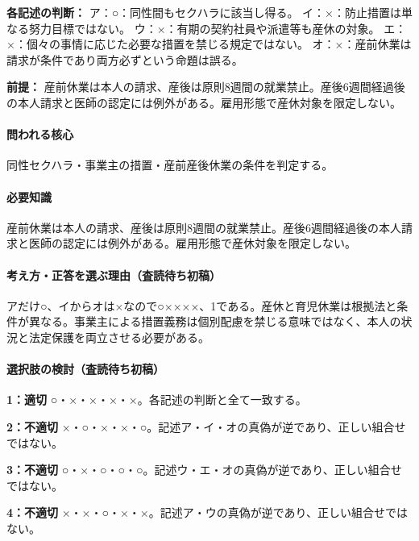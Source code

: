 \noindent\textbf{各記述の判断：} ア：○：同性間もセクハラに該当し得る。 イ：×：防止措置は単なる努力目標ではない。 ウ：×：有期の契約社員や派遣等も産休の対象。 エ：×：個々の事情に応じた必要な措置を禁じる規定ではない。 オ：×：産前休業は請求が条件であり両方必ずという命題は誤る。\par

\noindent\textbf{前提：} 産前休業は本人の請求、産後は原則8週間の就業禁止。産後6週間経過後の本人請求と医師の認定には例外がある。雇用形態で産休対象を限定しない。\par

\paragraph{問われる核心} 同性セクハラ・事業主の措置・産前産後休業の条件を判定する。

\paragraph{必要知識} 産前休業は本人の請求、産後は原則8週間の就業禁止。産後6週間経過後の本人請求と医師の認定には例外がある。雇用形態で産休対象を限定しない。

\paragraph{考え方・正答を選ぶ理由（査読待ち初稿）} アだけ○、イからオは×なので○××××、1である。産休と育児休業は根拠法と条件が異なる。事業主による措置義務は個別配慮を禁じる意味ではなく、本人の状況と法定保護を両立させる必要がある。

\paragraph{選択肢の検討（査読待ち初稿）}\mbox{}\par

\noindent\textbf{1：適切} ○・×・×・×・×。各記述の判断と全て一致する。\par

\noindent\textbf{2：不適切} ×・○・×・×・○。記述ア・イ・オの真偽が逆であり、正しい組合せではない。\par

\noindent\textbf{3：不適切} ○・×・○・○・○。記述ウ・エ・オの真偽が逆であり、正しい組合せではない。\par

\noindent\textbf{4：不適切} ×・×・○・×・×。記述ア・ウの真偽が逆であり、正しい組合せではない。\par

